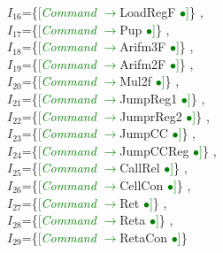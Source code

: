 \documentclass[a0]{a0poster}
\begin{document}
$I_{16}$=\{\textcolor{Green}{[}\textcolor{Green}{\textit{Command}} \textcolor{Green}{$\to$}LoadRegF \textcolor{Green}{$\bullet$}\textcolor{Green}{]}\}
,\\
$I_{17}$=\{\textcolor{Green}{[}\textcolor{Green}{\textit{Command}} \textcolor{Green}{$\to$}Pup \textcolor{Green}{$\bullet$}\textcolor{Green}{]}\}
,\\
$I_{18}$=\{\textcolor{Green}{[}\textcolor{Green}{\textit{Command}} \textcolor{Green}{$\to$}Arifm3F \textcolor{Green}{$\bullet$}\textcolor{Green}{]}\}
,\\
$I_{19}$=\{\textcolor{Green}{[}\textcolor{Green}{\textit{Command}} \textcolor{Green}{$\to$}Arifm2F \textcolor{Green}{$\bullet$}\textcolor{Green}{]}\}
,\\
$I_{20}$=\{\textcolor{Green}{[}\textcolor{Green}{\textit{Command}} \textcolor{Green}{$\to$}Mul2f \textcolor{Green}{$\bullet$}\textcolor{Green}{]}\}
,\\
$I_{21}$=\{\textcolor{Green}{[}\textcolor{Green}{\textit{Command}} \textcolor{Green}{$\to$}JumpReg1 \textcolor{Green}{$\bullet$}\textcolor{Green}{]}\}
,\\
$I_{22}$=\{\textcolor{Green}{[}\textcolor{Green}{\textit{Command}} \textcolor{Green}{$\to$}JumprReg2 \textcolor{Green}{$\bullet$}\textcolor{Green}{]}\}
,\\
$I_{23}$=\{\textcolor{Green}{[}\textcolor{Green}{\textit{Command}} \textcolor{Green}{$\to$}JumpCC \textcolor{Green}{$\bullet$}\textcolor{Green}{]}\}
,\\
$I_{24}$=\{\textcolor{Green}{[}\textcolor{Green}{\textit{Command}} \textcolor{Green}{$\to$}JumpCCReg \textcolor{Green}{$\bullet$}\textcolor{Green}{]}\}
,\\
$I_{25}$=\{\textcolor{Green}{[}\textcolor{Green}{\textit{Command}} \textcolor{Green}{$\to$}CallRel \textcolor{Green}{$\bullet$}\textcolor{Green}{]}\}
,\\
$I_{26}$=\{\textcolor{Green}{[}\textcolor{Green}{\textit{Command}} \textcolor{Green}{$\to$}CellCon \textcolor{Green}{$\bullet$}\textcolor{Green}{]}\}
,\\
$I_{27}$=\{\textcolor{Green}{[}\textcolor{Green}{\textit{Command}} \textcolor{Green}{$\to$}Ret \textcolor{Green}{$\bullet$}\textcolor{Green}{]}\}
,\\
$I_{28}$=\{\textcolor{Green}{[}\textcolor{Green}{\textit{Command}} \textcolor{Green}{$\to$}Reta \textcolor{Green}{$\bullet$}\textcolor{Green}{]}\}
,\\
$I_{29}$=\{\textcolor{Green}{[}\textcolor{Green}{\textit{Command}} \textcolor{Green}{$\to$}RetaCon \textcolor{Green}{$\bullet$}\textcolor{Green}{]}\}
\end{document}
